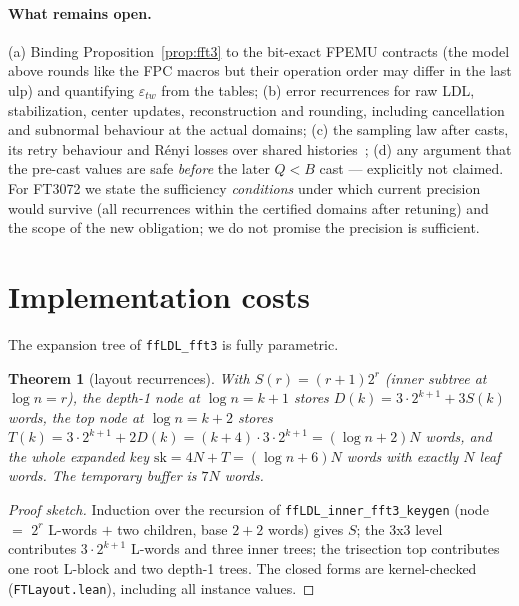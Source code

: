 \documentclass[11pt,a4paper]{article}
\newtheorem{theorem}{Theorem}
\theoremstyle{remark}
\begin{document}
\paragraph{What remains open.} (a) Binding
Proposition~\ref{prop:fft3} to the bit-exact FPEMU contracts (the model
above rounds like the FPC macros but their operation order may differ in the
last ulp) and quantifying $\varepsilon_{tw}$ from the tables; (b) error
recurrences for raw LDL, stabilization, center updates, reconstruction and
rounding, including cancellation and subnormal behaviour at the actual
domains; (c) the sampling law after casts, its retry behaviour and R\'enyi
losses over shared histories~\cite{prest17renyi}; (d) any argument that the
pre-cast values are safe \emph{before} the later $Q<B$ cast --- explicitly
not claimed. For FT3072 we state the sufficiency \emph{conditions} under
which current precision would survive (all recurrences within the certified
domains after retuning) and the scope of the new obligation; we do not
promise the precision is sufficient.

\section{Implementation costs}
\label{sec:costs}

The expansion tree of \texttt{ffLDL\_fft3} is fully parametric.

\begin{theorem}[layout recurrences]\label{thm:layout}
With $S(r)=(r+1)2^r$ (inner subtree at $\log n=r$), the depth-1 node at
$\log n{=}k{+}1$ stores $D(k)=3\cdot2^{k+1}+3S(k)$ words, the top node at
$\log n{=}k{+}2$ stores $T(k)=3\cdot2^{k+1}+2D(k)=(k{+}4)\cdot 3\cdot 2^{k+1}
=(\log n+2)N$ words, and the whole expanded key
$\mathrm{sk}=4N+T=(\log n+6)N$ words with exactly $N$ leaf words. The
temporary buffer is $7N$ words.
\end{theorem}

\begin{proof}[Proof sketch]
Induction over the recursion of \texttt{ffLDL\_inner\_fft3\_keygen} (node
$=$ $2^r$ L-words $+$ two children, base $2+2$ words) gives $S$; the 3x3
level contributes $3\cdot2^{k+1}$ L-words and three inner trees; the
trisection top contributes one root L-block and two depth-1 trees. The
closed forms are kernel-checked (\texttt{FTLayout.lean}), including all
instance values.
\end{proof}
\end{document}
